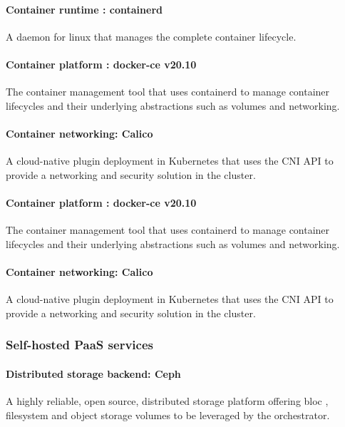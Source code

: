 \paragraph{Container runtime : containerd }

A daemon for linux that manages the complete container lifecycle. 

\paragraph{Container platform : docker-ce v20.10 }

The container management tool that uses containerd to manage container lifecycles and their underlying abstractions such as volumes and networking.  

\paragraph{Container networking: Calico }

A cloud-native plugin deployment in Kubernetes that uses the CNI API to provide a networking and security solution in the cluster. 

\paragraph{Container platform : docker-ce v20.10 }

The container management tool that uses containerd to manage container lifecycles and their underlying abstractions such as volumes and networking. 

\paragraph{Container networking: Calico }

A cloud-native plugin deployment in Kubernetes that uses the CNI API to provide a networking and security solution in the cluster. 


\subsubsection{Self-hosted PaaS services }

\paragraph{Distributed storage backend: Ceph }

A highly reliable, open source, distributed storage platform offering bloc , filesystem and object storage volumes to be leveraged by the orchestrator. 

